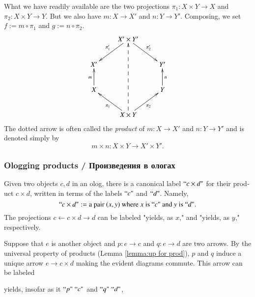 \documentclass{book}
\def\tn{\textnormal}
\newcommand{\qt}[1]{\tn{``}#1\tn{"}}
\def\to{\rightarrow}
\def\from{\leftarrow}
\def\taking{\colon}
\theoremstyle{theoremENG}
\theoremstyle{lemmaENG}
\theoremstyle{propositionENG}
\theoremstyle{corollaryENG}
\theoremstyle{factENG}
\theoremstyle{remarkENG}
\theoremstyle{exampleENG}
\newtheorem{exampleENG}[subsubsection]{\begin{english}Example\end{english}}
\theoremstyle{warningENG}
\theoremstyle{questionENG}
\theoremstyle{guessENG}
\theoremstyle{answerENG}
\theoremstyle{constructionENG}
\theoremstyle{rulesENG}
\theoremstyle{excENG}
\theoremstyle{appENG}
\theoremstyle{definitionENG}
\theoremstyle{notationENG}
\theoremstyle{conjectureENG}
\theoremstyle{postulateENG}
\theoremstyle{theoremRUS}
\theoremstyle{lemmaRUS}
\theoremstyle{propositionRUS}
\theoremstyle{corollaryRUS}
\theoremstyle{factRUS}
\theoremstyle{remarkRUS}
\theoremstyle{exampleRUS}
\theoremstyle{warningRUS}
\theoremstyle{questionRUS}
\theoremstyle{guessRUS}
\theoremstyle{answerRUS}
\theoremstyle{constructionRUS}
\theoremstyle{rulesRUS}
\theoremstyle{excRUS}
\theoremstyle{appRUS}
\theoremstyle{definitionRUS}
\theoremstyle{notationRUS}
\theoremstyle{conjectureRUS}
\theoremstyle{postulateRUS}
\begin{document}
\begin{english}
\begin{exampleENG}
What we have readily available are the two projections $\pi_1\taking X\times Y\to X$ and $\pi_2\taking X\times Y\to Y$. But we also have $m\taking X\to X'$ and $n\taking Y\to Y'$. Composing, we set $f:=m\circ \pi_1$ and $g:=n\circ\pi_2$.
$$\xymatrix{
&X'\times Y'\ar[dl]_{\pi_1'}\ar[dr]^{\pi_2'}\\
X'&&Y'\\
X\ar[u]^m&&Y\ar[u]_n\\
&X\times Y\ar[ul]^{\pi_1}\ar[ur]_{\pi_2}\ar@{-->}[uuu]
}
$$
The dotted arrow is often called the {\em product} of $m\taking X\to X'$ and $n\taking Y\to Y'$ and is denoted simply by 
$$m\times n\taking X\times Y\to X'\times Y'.$$

\begin{russian} \end{russian}

\end{exampleENG}


\subsubsection{Ologging products / Произведения в ологах}\label{sec:ologging products}

Given two objects $c,d$ in an olog, there is a canonical label $\qt{c\times d}$ for their product $c\times d$, written in terms of the labels $\qt{c}$ and $\qt{d}$. Namely, $$\qt{c\times d}:=\tn{a pair }(x,y)\tn{ where }x\tn{ is }\qt{c}\tn{ and }y\tn{ is }\qt{d}.$$ The projections $c\from c\times d\to d$ can be labeled "yields, as $x$," and "yields, as $y$," respectively.

\begin{russian} \end{russian}

Suppose that $e$ is another object and $p\taking e\to c$ and $q\taking e\to d$ are two arrows. By the universal property of products (Lemma \ref{lemma:up for prod}), $p$ and $q$ induce a unique arrow $e\to c\times d$ making the evident diagrams commute. This arrow can be labeled
\begin{center}
yields, insofar as it $\qt{p}\;\qt{c}$ and $\qt{q}\;\qt{d}$, 
\end{center}

\begin{russian} \end{russian}

\begin{exampleENG}


\end{exampleENG}
\end{english}
\end{document}
